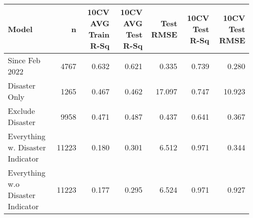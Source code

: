 
\begin{tabular}{l|r|r|r|r|r|r}
\hline
Model & n & 10CV AVG Train R-Sq & 10CV AVG Test R-Sq & Test RMSE & 10CV Test R-Sq & 10CV Test RMSE\\
\hline
Since Feb 2022 & 4767 & 0.632 & 0.621 & 0.335 & 0.739 & 0.280\\
\hline
Disaster Only & 1265 & 0.467 & 0.462 & 17.097 & 0.747 & 10.923\\
\hline
Exclude Disaster & 9958 & 0.471 & 0.487 & 0.437 & 0.641 & 0.367\\
\hline
Everything w. Disaster Indicator & 11223 & 0.180 & 0.301 & 6.512 & 0.971 & 0.344\\
\hline
Everything w.o Disaster Indicator & 11223 & 0.177 & 0.295 & 6.524 & 0.971 & 0.927\\
\hline
\end{tabular}
